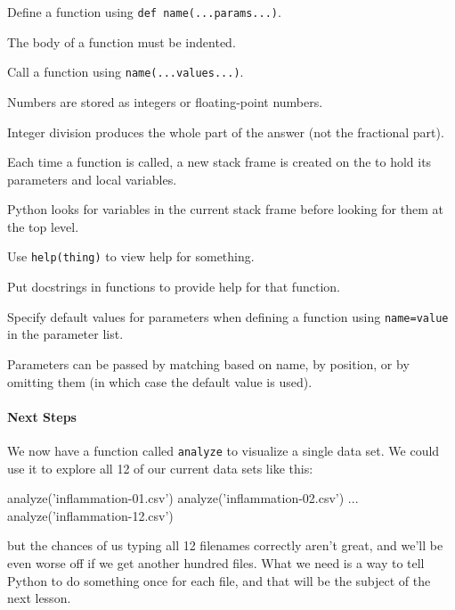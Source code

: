 \documentclass{book}
\begin{document}
\begin{keypoints}
\begin{swcitemize}
\item
  Define a function using \texttt{def name(...params...)}.
\item
  The body of a function must be indented.
\item
  Call a function using \texttt{name(...values...)}.
\item
  Numbers are stored as integers or floating-point numbers.
\item
  Integer division produces the whole part of the answer (not the
  fractional part).
\item
  Each time a function is called, a new stack frame is created on the
   to hold its parameters and local
  variables.
\item
  Python looks for variables in the current stack frame before looking
  for them at the top level.
\item
  Use \texttt{help(thing)} to view help for something.
\item
  Put docstrings in functions to provide help for that function.
\item
  Specify default values for parameters when defining a function using
  \texttt{name=value} in the parameter list.
\item
  Parameters can be passed by matching based on name, by position, or by
  omitting them (in which case the default value is used).
\end{swcitemize}
\end{keypoints}

\mbox{}\paragraph{Next Steps}

We now have a function called \texttt{analyze} to visualize a single
data set. We could use it to explore all 12 of our current data sets
like this:

\begin{VerbIn}
analyze('inflammation-01.csv')
analyze('inflammation-02.csv')
...
analyze('inflammation-12.csv')
\end{VerbIn}

but the chances of us typing all 12 filenames correctly aren't great,
and we'll be even worse off if we get another hundred files. What we
need is a way to tell Python to do something once for each file, and
that will be the subject of the next lesson.
\end{document}
